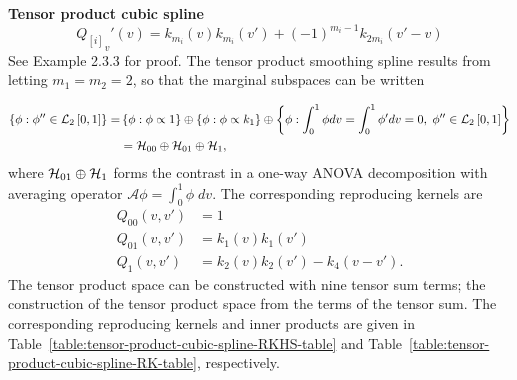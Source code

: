 \begin{example}{\textbf {Tensor product cubic spline}}
\begin{equation}
{Q_{\left[i\right]} }_v'\left(v\right) = k_{m_i}\left(v\right)k_{m_i}\left(v'\right) + \left(-1\right)^{m_i-1}k_{2m_i}\left(v' - v\right)
\end{equation}
\noindent
See \citet{gu2002smoothing} Example 2.3.3 for proof. The tensor product smoothing spline results from letting $m_1 = m_2 = 2$, so that the marginal subspaces can be written

\begin{align} \label{eq:cubic-spline-hilbert-space}
\left\{ \phi: \phi'' \in \mathcal{L}_2\left[0,1\right] \right\} = &\left\{ \phi: \phi \propto 1 \right\} \oplus  \left\{ \phi: \phi \propto k_1 \right\} \oplus \left\{ \phi: \int_0^1 \phi dv = \int_0^1 \phi' dv = 0,\; \phi'' \in \mathcal{L}_2\left[0,1\right]  \right\} \\
&= \mathcal{H}_{00} \oplus \mathcal{H}_{01} \oplus \mathcal{H}_1,
\end{align}
\noindent
where $ \mathcal{H}_{01} \oplus \mathcal{H}_1$ forms the contrast in a one-way ANOVA decomposition with averaging operator $\mathcal{A}\phi = \int_0^1 \phi\;dv$. The corresponding reproducing kernels are
\begin{align} \label{eq:cubic-spline-hilbert-space-rks}
Q_{00}\left(v,v'\right) &= 1\\
Q_{01}\left(v,v'\right) &= k_1\left(v\right)k_1\left(v'\right)\\
Q_{1}\left(v,v'\right) &= k_2\left(v\right)k_2\left(v'\right) - k_4\left(v-v'\right).
\end{align}
\noindent
The tensor product space can be constructed with nine tensor sum terms; the construction of the tensor product space from the terms of the tensor sum. The corresponding reproducing kernels and inner products are given in Table~\ref{table:tensor-product-cubic-spline-RKHS-table} and Table~\ref{table:tensor-product-cubic-spline-RK-table}, respectively.


\end{example}
